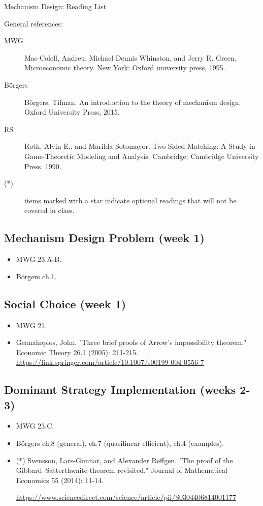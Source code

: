 \documentclass{article}
\begin{document}
\begin{center}
	{\huge Mechanism Design: Reading List}
\end{center}
\bigskip

General references:
\begin{description}
	\item[MWG] Mas-Colell, Andreu, Michael Dennis Whinston, and Jerry R. Green. Microeconomic theory. New York: Oxford university press, 1995. 
	\item[B\"{o}rgers] B\"{o}rgers, Tilman. An introduction to the theory of mechanism design. Oxford University Press, 2015.
	\item[RS] Roth, Alvin E., and Marilda Sotomayor. Two-Sided Matching: A Study in Game-Theoretic Modeling and Analysis. Cambridge: Cambridge University Press. 1990.
	\item[(*)] items marked with a star indicate optional readings that will not be covered in class.
\end{description}
\medskip

\subsection{Mechanism Design Problem (week 1)}
\begin{itemize}
	\item MWG 23.A-B.
	\item B{\"o}rgers ch.1.
\end{itemize}

\subsection{Social Choice (week 1)}
\begin{itemize}
	\item MWG 21.
	\item Geanakoplos, John. "Three brief proofs of Arrow’s impossibility theorem." Economic Theory 26.1 (2005): 211-215. \url{https://link.springer.com/article/10.1007/s00199-004-0556-7}
\end{itemize}

\subsection{Dominant Strategy Implementation (weeks 2-3)}
\begin{itemize}
	\item MWG 23.C.
	\item B{\"o}rgers ch.8 (general), ch.7 (quasilinear efficient), ch.4 (examples).
	\item (*) Svensson, Lars-Gunnar, and Alexander Reffgen. "The proof of the Gibbard–Satterthwaite theorem revisited." Journal of Mathematical Economics 55 (2014): 11-14.
	
	\url{https://www.sciencedirect.com/science/article/pii/S0304406814001177}
\end{itemize}
\end{document}
